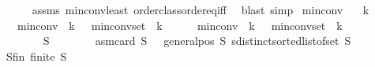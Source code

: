 \begin{isabellebody}
\ \ \ \ \isamarkupfalse%
\ assms\ min{\isacharunderscore}{\kern0pt}conv{\isacharunderscore}{\kern0pt}least\ order{\isacharunderscore}{\kern0pt}class{\isachardot}{\kern0pt}order{\isacharunderscore}{\kern0pt}eq{\isacharunderscore}{\kern0pt}iff\ \isamarkupfalse%
\ {\isacharparenleft}{\kern0pt}blast{\isacharcomma}{\kern0pt}\ simp{\isacharparenright}{\kern0pt}\isanewline
{}\isamarkupfalse%
%
\endisatagproof
{\isafoldproof}%
%
\isadelimproof
\isanewline
%
\endisadelimproof
\isanewline
{}\isamarkupfalse%
\ min{\isacharunderscore}{\kern0pt}conv{\isacharunderscore}{\kern0pt}{}{\isacharcolon}{\kern0pt}\isanewline
\ \ \ {\isachardoublequoteopen}k{\isasymge}{}{\isachardoublequoteclose}\ \ \isanewline
\ \ \ {\isachardoublequoteopen}min{\isacharunderscore}{\kern0pt}conv\ {}\ k\ {\isacharequal}{\kern0pt}\ {}{\isachardoublequoteclose}\ {\isachardoublequoteopen}min{\isacharunderscore}{\kern0pt}conv{\isacharunderscore}{\kern0pt}set\ {}\ k\ {\isasymnoteq}\ {\isacharbraceleft}{\kern0pt}{\isacharbraceright}{\kern0pt}{\isachardoublequoteclose}\isanewline
%
\isadelimproof
%
\endisadelimproof
%
\isatagproof
{}\isamarkupfalse%
{\isacharminus}{\kern0pt}\isanewline
\ \ \isamarkupfalse%
\ {\isachardoublequoteopen}min{\isacharunderscore}{\kern0pt}conv\ {}\ k\ {\isasymle}\ {}{\isachardoublequoteclose}\ {\isachardoublequoteopen}min{\isacharunderscore}{\kern0pt}conv{\isacharunderscore}{\kern0pt}set\ {}\ k\ {\isasymnoteq}\ {\isacharbraceleft}{\kern0pt}{\isacharbraceright}{\kern0pt}{\isachardoublequoteclose}\isanewline
\ \ \isamarkupfalse%
{\isacharminus}{\kern0pt}\isanewline
\ \ \ \ \isakeywordONE{{\isacharbraceleft}{\kern0pt}}\isamarkupfalse%
\isanewline
\ \ \ \ \ \ \isamarkupfalse%
\ S\isanewline
\ \ \ \ \ \ \isamarkupfalse%
\ asm{\isacharcolon}{\kern0pt}{\isachardoublequoteopen}card\ S\ {\isacharequal}{\kern0pt}\ {}{\isachardoublequoteclose}\ {\isachardoublequoteopen}general{\isacharunderscore}{\kern0pt}pos\ S{\isachardoublequoteclose}\ {\isachardoublequoteopen}sdistinct{\isacharparenleft}{\kern0pt}sorted{\isacharunderscore}{\kern0pt}list{\isacharunderscore}{\kern0pt}of{\isacharunderscore}{\kern0pt}set\ S{\isacharparenright}{\kern0pt}{\isachardoublequoteclose}\isanewline
\ \ \ \ \ \ \isamarkupfalse%
\ S{\isacharunderscore}{\kern0pt}fin{\isacharcolon}{\kern0pt}\ {\isachardoublequoteopen}finite\ S{\isachardoublequoteclose}\ \isamarkupfalse%

\end{isabellebody}
